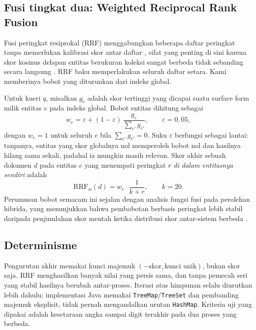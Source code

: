 \documentclass[journal,twoside,web]{ieeecolor}
\begin{document}
\subsection{Fusi tingkat dua: Weighted Reciprocal Rank Fusion}

Fusi peringkat resiprokal (RRF) menggabungkan beberapa daftar peringkat tanpa
memerlukan kalibrasi skor antar daftar \cite{cormack2009}, sifat yang penting di
sini karena skor kosinus delapan entitas berukuran koleksi sangat berbeda tidak
sebanding secara langsung \cite{zobel1998}. RRF baku memperlakukan seluruh daftar
setara. Kami memberinya bobot yang diturunkan dari indeks global.

Untuk kueri $q$, misalkan $g_e$ adalah skor tertinggi yang dicapai suatu surface
form milik entitas $e$ pada indeks global. Bobot entitas dihitung sebagai
\begin{equation}
w_e = \varepsilon + (1-\varepsilon)\,\frac{g_e}{\sum_{e'} g_{e'}},
\qquad \varepsilon = 0{,}05,
\label{eq:bobot}
\end{equation}
dengan $w_e = 1$ untuk seluruh $e$ bila $\sum_{e'} g_{e'} = 0$. Suku $\varepsilon$
berfungsi sebagai lantai: tanpanya, entitas yang skor globalnya nol memperoleh
bobot nol dan hasilnya hilang sama sekali, padahal ia mungkin masih relevan.
Skor akhir sebuah dokumen $d$ pada entitas $e$ yang menempati peringkat $r$
\emph{di dalam entitasnya sendiri} adalah
\begin{equation}
\mathrm{RRF}_w(d) = w_e \cdot \frac{1}{k + r}, \qquad k = 20.
\label{eq:rrf}
\end{equation}
Perumusan bobot semacam ini sejalan dengan analisis fungsi fusi pada perolehan
hibrida, yang menunjukkan bahwa pembobotan berbasis peringkat lebih stabil
daripada penjumlahan skor mentah ketika distribusi skor antar-sistem berbeda
\cite{bruch2023}.

\subsection{Determinisme}

Pengurutan akhir memakai kunci majemuk $(-\text{skor}, \text{kunci unik})$, bukan
skor saja. RRF menghasilkan banyak nilai yang persis sama, dan tanpa pemecah seri
yang stabil hasilnya berubah antar-proses. Iterasi atas himpunan selalu diurutkan
lebih dahulu; implementasi Java memakai \texttt{TreeMap}/\texttt{TreeSet} dan
pembanding majemuk eksplisit, tidak pernah mengandalkan urutan \texttt{HashMap}.
Kriteria uji yang dipakai adalah kesetaraan angka sampai digit terakhir pada dua
proses yang berbeda.
\end{document}

